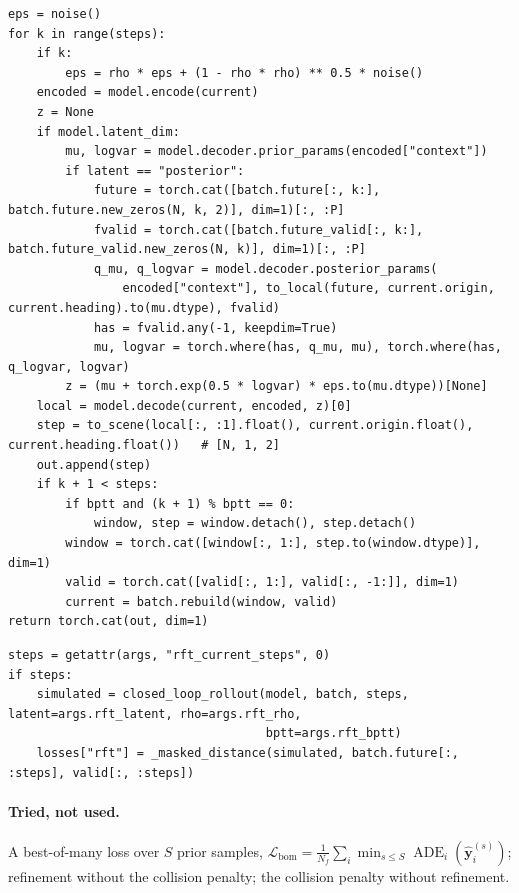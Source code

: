 \documentclass[10pt]{article}
\begin{document}
\begin{lstlisting}[aboveskip=2pt]
eps = noise()
for k in range(steps):
    if k:
        eps = rho * eps + (1 - rho * rho) ** 0.5 * noise()
    encoded = model.encode(current)
    z = None
    if model.latent_dim:
        mu, logvar = model.decoder.prior_params(encoded["context"])
        if latent == "posterior":
            future = torch.cat([batch.future[:, k:], batch.future.new_zeros(N, k, 2)], dim=1)[:, :P]
            fvalid = torch.cat([batch.future_valid[:, k:], batch.future_valid.new_zeros(N, k)], dim=1)[:, :P]
            q_mu, q_logvar = model.decoder.posterior_params(
                encoded["context"], to_local(future, current.origin, current.heading).to(mu.dtype), fvalid)
            has = fvalid.any(-1, keepdim=True)
            mu, logvar = torch.where(has, q_mu, mu), torch.where(has, q_logvar, logvar)
        z = (mu + torch.exp(0.5 * logvar) * eps.to(mu.dtype))[None]
    local = model.decode(current, encoded, z)[0]
    step = to_scene(local[:, :1].float(), current.origin.float(), current.heading.float())   # [N, 1, 2]
    out.append(step)
    if k + 1 < steps:
        if bptt and (k + 1) % bptt == 0:
            window, step = window.detach(), step.detach()
        window = torch.cat([window[:, 1:], step.to(window.dtype)], dim=1)
        valid = torch.cat([valid[:, 1:], valid[:, -1:]], dim=1)
        current = batch.rebuild(window, valid)
return torch.cat(out, dim=1)
\end{lstlisting}

\par\smallskip{}\par\nopagebreak
\begin{lstlisting}[aboveskip=2pt]
steps = getattr(args, "rft_current_steps", 0)
if steps:
    simulated = closed_loop_rollout(model, batch, steps, latent=args.rft_latent, rho=args.rft_rho,
                                    bptt=args.rft_bptt)
    losses["rft"] = _masked_distance(simulated, batch.future[:, :steps], valid[:, :steps])
\end{lstlisting}

\paragraph{Tried, not used.} A best-of-many loss over $S$ prior samples,
$\mathcal L_{\text{bom}}=\frac1{N_f}\sum_i\min_{s\le S}\operatorname{ADE}_i(\hat{\mathbf y}^{(s)}_i)$; refinement without the collision
penalty; the collision penalty without refinement.
\end{document}
